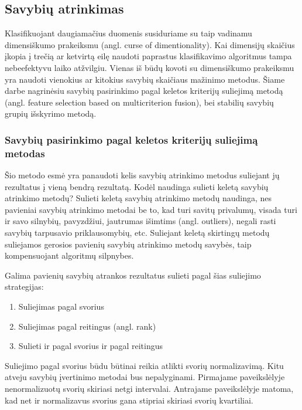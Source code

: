 \subsection{Savybių atrinkimas}

Klasifikuojant daugiamačius duomenis susiduriame su taip vadinamu dimensiškumo
prakeiksmu (angl. curse of dimentionality). Kai dimensijų skaičius įkopia į
trečią ar ketvirtą eilę naudoti paprastus klasifikavimo algoritmus tampa
nebeefektyvu laiko atžvilgiu. Vienas iš būdų kovoti su dimensiškumo prakeiksmu
yra naudoti vienokius ar kitokius savybių skaičiaus mažinimo metodus. Šiame
darbe nagrinėsiu savybių pasirinkimo pagal keletos kriterijų suliejimą metodą
(angl.
feature selection based on multicriterion fusion)\cite{5611484}, bei
stabilių savybių grupių išskyrimo metodą\cite{Loscalzo:2009:CGS:1557019.1557084}.

\subsubsection{Savybių pasirinkimo pagal keletos kriterijų suliejimą metodas}

Šio metodo esmė yra panaudoti kelis savybių atrinkimo metodus suliejant jų
rezultatus į vieną bendrą rezultatą. Kodėl naudinga sulieti keletą savybių
atrinkimo metodų? Sulieti keletą savybių atrinkimo metodų naudinga, nes
pavieniai savybių atrinkimo metodai be to, kad turi savitų privalumų, visada
turi ir savo silnybių, pavyzdžiui, jautrumas išimtims (angl. outliers), negali
rasti savybių tarpusavio priklausomybių, etc. Suliejant keletą skirtingų metodų
suliejamos gerosios pavienių savybių atrinkimo metodų savybės, taip
kompensuojant algoritmų silpnybes.

Galima pavienių savybių atrankos rezultatus sulieti pagal šias suliejimo
strategijas:
\begin{enumerate}
  \item Suliejimas pagal svorius
  \item Suliejimas pagal reitingus (angl. rank)
  \item Sulieti ir pagal svorius ir pagal reitingus
\end{enumerate}

Suliejimo pagal svorius būdu būtinai reikia atlikti svorių normalizavimą. Kitu
atveju savybių įvertinimo metodai bus nepalyginami. Pirmajame paveikslėlyje
nenormalizuotų svorių skiriasi netgi intervalai. Antrajame paveikslėlyje matoma,
kad net ir normalizavus svorius gana stipriai skiriasi svorių kvartiliai.

